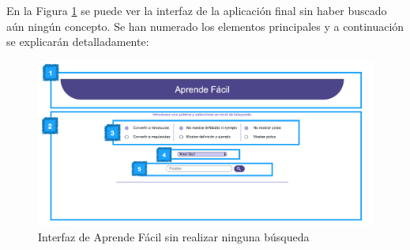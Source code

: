 En la Figura \ref{fig:paginaInicial} se puede ver la interfaz de la aplicación final sin haber buscado aún ningún concepto. Se han numerado los elementos principales y a continuación se explicarán detalladamente:

\begin{figure}[!h]
	\includegraphics[width=1.1\textwidth]{Imagenes/Bitmap/Capitulo4/Frontend/paginaInicial.png}
	\centering
	\caption{Interfaz de Aprende Fácil  sin realizar ninguna búsqueda}
	\label{fig:paginaInicial}
\end{figure}


